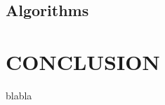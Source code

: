\documentclass[a4paper, 10pt, conference]{ieeeconf}      %
\begin{document}
\subsection{Algorithms}

\section{CONCLUSION}




















\begin{thebibliography}{}

blabla

\end{thebibliography}
\end{document}

